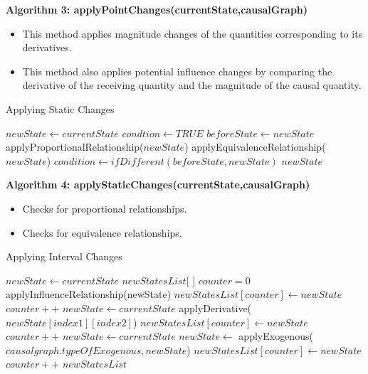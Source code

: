 \documentclass{article}
\begin{document}
\textbf{Algorithm 3: applyPointChanges(currentState,causalGraph)}
\begin{itemize}
	\item This method applies magnitude changes of the quantities corresponding to its derivatives. 
	\item This method also applies potential influence changes by comparing the derivative of the receiving quantity and the magnitude of the causal quantity.
\end{itemize}

\begin{algorithm}[!h]
	\caption{Applying Static Changes}\label{staticchanges}
	\begin{algorithmic}[1]
		\State $newState \gets currentState$
		\State $condtion \gets TRUE$
		\State $beforeState \gets newState$
		\State applyProportionalRelationship($newState$)
		\EndIf
		\State applyEquivalenceRelationship($newState$)
		\EndIf
		\State $condition \gets ifDifferent(beforeState,newState)$
		\EndFor
		\EndWhile
		\State \Return $newState$
		\EndProcedure
	\end{algorithmic}
\end{algorithm}


\textbf{Algorithm 4: applyStaticChanges(currentState,causalGraph)}
\begin{itemize}
	\item Checks for proportional relationships.
	\item Checks for equivalence relationships.
\end{itemize}

\begin{algorithm}[!h]
	\caption{Applying Interval Changes}\label{intervalchanges}
	\begin{algorithmic}[1]
		\State $newState \gets currentState$
		\State $newStatesList$[ ]
		\State $counter=0$
		\State applyInfluenceRelationship(newState)
		\EndIf
		\State $newStatesList[counter] \gets newState$
		\State $counter++$
		\EndIf
		\EndFor
		\State $newState \gets currentState$
		\State applyDerivative($newState[index1][index2]$)
		\State $newStatesList[counter] \gets newState$
		\State $counter++$
		\EndIf
		\EndFor
		\EndFor
		\State $newState \gets currentState$
		\State $newState \gets$ applyExogenous($causalgraph.typeOfExogenous,newState$)
		\State $newStatesList[counter] \gets newState$
		\State $counter++$
		\EndIf
		\State \Return $newStatesList$
		\EndProcedure
	\end{algorithmic}
\end{algorithm}
\end{document}
